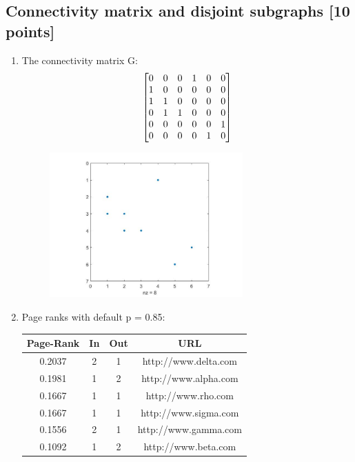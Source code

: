 \documentclass[unicode,11pt,a4paper,oneside,numbers=endperiod,openany]{scrartcl}
\begin{document}
\subsection{Connectivity matrix and disjoint subgraphs [10 points]}
\begin{enumerate}
    \item The connectivity matrix G:
    \[
    \begin{bmatrix}
    \centering
    0 & 0 & 0 & 1 & 0 & 0\\
    1 & 0 & 0 & 0 & 0 & 0\\
    1 & 1 & 0 & 0 & 0 & 0\\
    0 & 1 & 1 & 0 & 0 & 0\\
    0 & 0 & 0 & 0 & 0 & 1\\
    0 & 0 & 0 & 0 & 1 & 0\\
    \end{bmatrix}
    \]

    \begin{figure}[H]
    \centering
    
    \includegraphics[width=0.7\textwidth]{myG.jpg}
    \end{figure}
    
    \newpage
    
    \item Page ranks with default p = 0.85:
    
    \begin{center}
         \begin{tabular}{||c | c | c | c||} 
         \hline
         Page-Rank & In & Out & URL \\ [0.5ex] 
         \hline\hline
         0.2037 & 2 & 1 & http://www.delta.com \\ 
         \hline
         0.1981 & 1 & 2 & http://www.alpha.com \\
         \hline
         0.1667 & 1 & 1 & http://www.rho.com \\
         \hline
         0.1667 & 1 & 1 & http://www.sigma.com \\
         \hline
         0.1556 & 2 & 1 & http://www.gamma.com \\
         \hline
         0.1092 & 1 & 2 & http://www.beta.com \\
         \hline
        \end{tabular}
        \end{center}
    

\end{enumerate}
\end{document}
